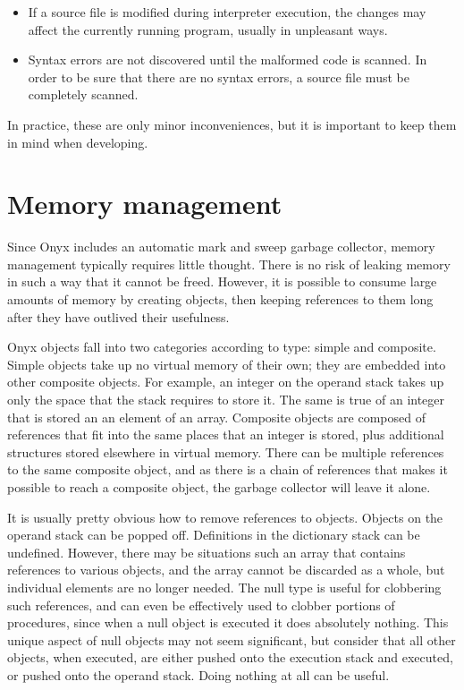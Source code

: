 \begin{itemize}
\item{If a source file is modified during interpreter execution, the changes may
affect the currently running program, usually in unpleasant ways.}
\item{Syntax errors are not discovered until the malformed code is scanned.  In
order to be sure that there are no syntax errors, a source file must be
completely scanned.}
\end{itemize}

In practice, these are only minor inconveniences, but it is important to keep
them in mind when developing.

\section{Memory management}

Since Onyx includes an automatic mark and sweep garbage collector, memory
management typically requires little thought.  There is no risk of leaking
memory in such a way that it cannot be freed.  However, it is possible to
consume large amounts of memory by creating objects, then keeping references to
them long after they have outlived their usefulness.

Onyx objects fall into two categories according to type: simple and composite.
Simple objects take up no virtual memory of their own; they are embedded into
other composite objects.  For example, an integer on the operand stack takes up
only the space that the stack requires to store it.  The same is true of an
integer that is stored an an element of an array.  Composite objects are
composed of references that fit into the same places that an integer is stored,
plus additional structures stored elsewhere in virtual memory.  There can be
multiple references to the same composite object, and as there is a chain of
references that makes it possible to reach a composite object, the garbage
collector will leave it alone.

It is usually pretty obvious how to remove references to objects.  Objects on
the operand stack can be popped off.  Definitions in the dictionary stack can be
undefined.  However, there may be situations such an array that contains
references to various objects, and the array cannot be discarded as a whole, but
individual elements are no longer needed.  The null type is useful for
clobbering such references, and can even be effectively used to clobber portions
of procedures, since when a null object is executed it does absolutely nothing.
This unique aspect of null objects may not seem significant, but consider that
all other objects, when executed, are either pushed onto the execution stack and
executed, or pushed onto the operand stack.  Doing nothing at all can be useful.

